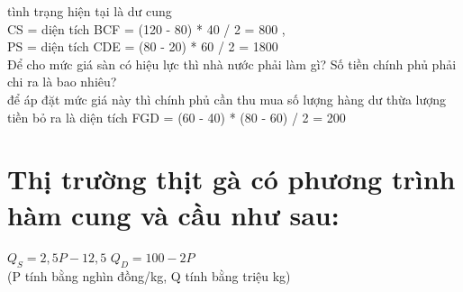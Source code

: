 \begin{enumerate}[a.]

          tình trạng hiện tại là dư cung \\
          CS = diện tích BCF = (120 - 80) * 40 / 2 = 800 , \\
          PS = diện tích CDE = (80 - 20) * 60 / 2 = 1800 \\
          Để cho mức giá sàn có hiệu lực thì nhà nước phải làm gì? Số tiền chính phủ phải chi ra
          là bao nhiêu? \\
          để áp đặt mức giá này thì chính phủ cần thu mua số lượng hàng dư thừa
          lượng tiền bỏ ra là diện tích FGD = (60 - 40) * (80 - 60) / 2 = 200

\end{enumerate}

\section{ Thị trường thịt gà có phương trình hàm cung và cầu như sau:}
$Q_S = 2,5P - 12,5$  $Q_D = 100 - 2P$ \\
(P tính bằng nghìn đồng/kg, Q tính bằng triệu kg)

